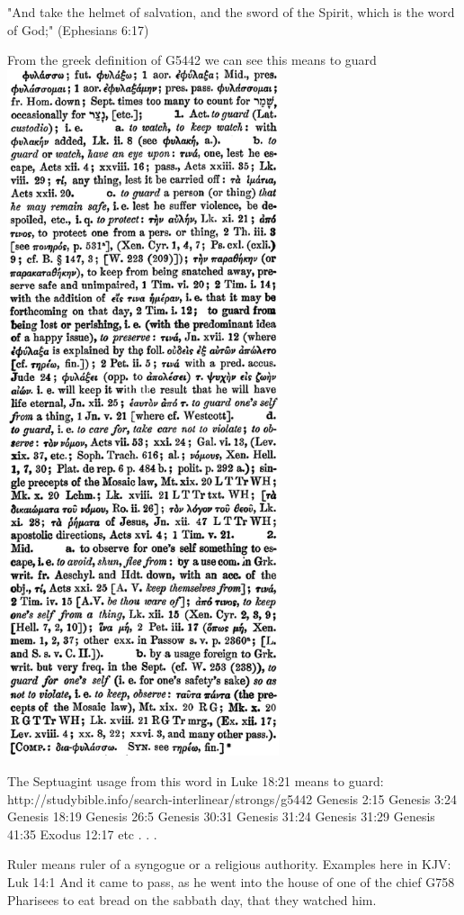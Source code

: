 \documentclass[11pt]{article}
\begin{document}
\begin{thebibliography}{37}
"And take the helmet of salvation, and the sword of the Spirit, which is the word of God;" (Ephesians 6:17)

From the greek definition of G5442 we can see this means to guard 
\includegraphics[width=8cm]{guard_greek}


 The Septuagint usage from this word in Luke 18:21 means to guard:
http://studybible.info/search-interlinear/strongs/g5442
Genesis 2:15
Genesis 3:24
Genesis 18:19
Genesis 26:5
Genesis 30:31
Genesis 31:24
Genesis 31:29
Genesis 41:35
Exodus 12:17
etc . . .

Ruler means ruler of a syngogue or a religious authority. Examples here in KJV:
 Luk 14:1
And it came to pass, as he went into the house of one of the chief G758 Pharisees to eat bread on the sabbath day, that they watched him.


\end{thebibliography}
\end{document}
